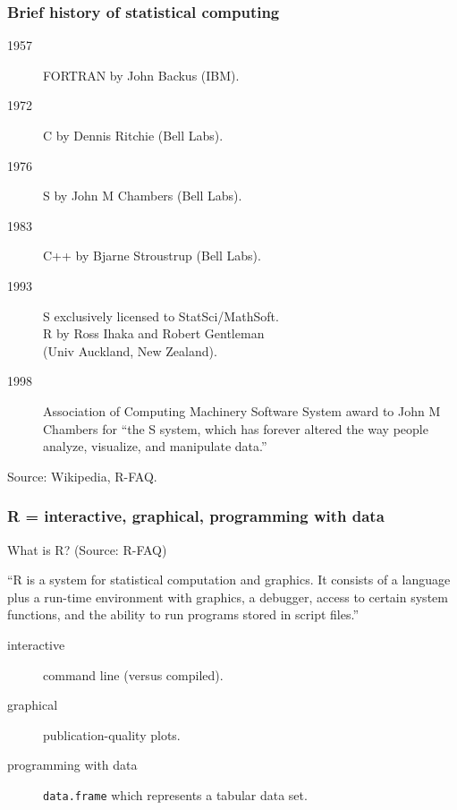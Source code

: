 \documentclass{beamer}
\begin{document}
\begin{frame}
  \frametitle{Brief history of statistical computing}
  \begin{description}
  \item[1957] FORTRAN by John Backus (IBM).
  \item[1972] C by Dennis Ritchie (Bell Labs).
  \item[1976] S by John M Chambers (Bell Labs).
  \item[1983] C++ by Bjarne Stroustrup (Bell Labs).
  \item[1993] S exclusively licensed to StatSci/MathSoft.\\
    R by Ross Ihaka and Robert Gentleman\\
    (Univ Auckland, New Zealand).
  \item[1998] Association of Computing Machinery Software System award
    to John M Chambers for ``the S system, which has forever altered
    the way people analyze, visualize, and manipulate data.''
  \end{description}
  
  \vskip 0.5cm Source: Wikipedia, R-FAQ.
\end{frame}

\begin{frame}
  \frametitle{R = interactive, graphical, programming with data}
  
  What is R? (Source: R-FAQ)

  ``R is a system for statistical computation and graphics. It
  consists of a language plus a run-time environment with graphics, a
  debugger, access to certain system functions, and the ability to run
  programs stored in script files.'' 

  \begin{description}
  \item[interactive] command line (versus compiled).
  \item[graphical] publication-quality plots.
  \item[programming with data] \texttt{data.frame} which represents a
    tabular data set.
  \end{description}
\end{frame}
\end{document}
